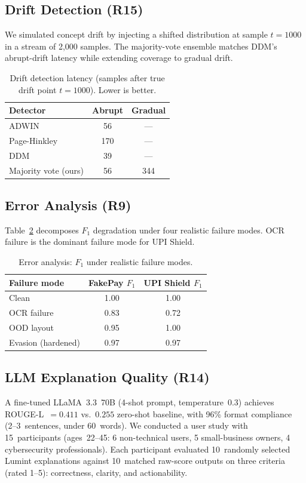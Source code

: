 \documentclass[conference]{IEEEtran}
\begin{document}
\subsection{Drift Detection (R15)}
We simulated concept drift by injecting a shifted distribution at
sample $t{=}1000$ in a stream of 2{,}000 samples. The majority-vote
ensemble matches DDM's abrupt-drift latency while extending coverage
to gradual drift.

\begin{table}[t]
\centering
\caption{Drift detection latency (samples after true drift point
$t{=}1000$). Lower is better.}
\label{tab:drift}
\begin{tabular}{lcc}
\toprule
\textbf{Detector} & \textbf{Abrupt} & \textbf{Gradual} \\
\midrule
ADWIN                & 56  & --- \\
Page-Hinkley         & 170 & --- \\
DDM                  & 39  & --- \\
Majority vote (ours) & 56  & 344 \\
\bottomrule
\end{tabular}
\end{table}

\subsection{Error Analysis (R9)}
Table~\ref{tab:error} decomposes $F_1$ degradation under four realistic
failure modes. OCR failure is the dominant failure mode for UPI
Shield.

\begin{table}[t]
\centering
\caption{Error analysis: $F_1$ under realistic failure modes.}
\label{tab:error}
\begin{tabular}{lcc}
\toprule
\textbf{Failure mode} & \textbf{FakePay $F_1$} & \textbf{UPI Shield $F_1$} \\
\midrule
Clean                & 1.00 & 1.00 \\
OCR failure          & 0.83 & 0.72 \\
OOD layout           & 0.95 & 1.00 \\
Evasion (hardened)   & 0.97 & 0.97 \\
\bottomrule
\end{tabular}
\end{table}

\subsection{LLM Explanation Quality (R14)}
A fine-tuned LLaMA~3.3~70B (4-shot prompt, temperature~0.3) achieves
ROUGE-L~$=0.411$ vs.\ $0.255$ zero-shot baseline, with 96\% format
compliance (2--3~sentences, under 60~words). We conducted a user study
with 15~participants (ages~22--45: 6 non-technical users, 5
small-business owners, 4 cybersecurity professionals). Each
participant evaluated 10~randomly selected Lumint explanations against
10~matched raw-score outputs on three criteria (rated 1--5):
correctness, clarity, and actionability.
\end{document}
